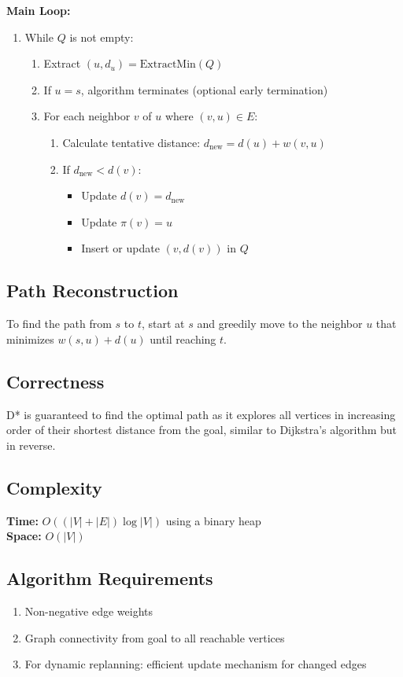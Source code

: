 \documentclass{article}
\begin{document}
\textbf{Main Loop:}
\begin{enumerate}
    \item While $Q$ is not empty:
    \begin{enumerate}
        \item Extract $(u, d_u) = \text{ExtractMin}(Q)$
        \item If $u = s$, algorithm terminates (optional early termination)
        \item For each neighbor $v$ of $u$ where $(v,u) \in E$:
        \begin{enumerate}
            \item Calculate tentative distance: $d_{\text{new}} = d(u) + w(v,u)$
            \item If $d_{\text{new}} < d(v)$:
            \begin{itemize}
                \item Update $d(v) = d_{\text{new}}$
                \item Update $\pi(v) = u$
                \item Insert or update $(v, d(v))$ in $Q$
            \end{itemize}
        \end{enumerate}
    \end{enumerate}
\end{enumerate}

\subsection{Path Reconstruction}
To find the path from $s$ to $t$, start at $s$ and greedily move to the neighbor $u$ that minimizes $w(s,u) + d(u)$ until reaching $t$.

\subsection{Correctness}
D* is guaranteed to find the optimal path as it explores all vertices in increasing order of their shortest distance from the goal, similar to Dijkstra's algorithm but in reverse.

\subsection{Complexity}
\textbf{Time:} $O((|V| + |E|) \log |V|)$ using a binary heap\\
\textbf{Space:} $O(|V|)$

\subsection{Algorithm Requirements}
\begin{enumerate}
    \item Non-negative edge weights
    \item Graph connectivity from goal to all reachable vertices
    \item For dynamic replanning: efficient update mechanism for changed edges
\end{enumerate}
\end{document}
